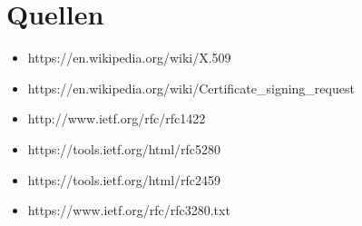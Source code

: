 \chapter{Quellen}
\begin{itemize}
\item https://en.wikipedia.org/wiki/X.509
\item https://en.wikipedia.org/wiki/Certificate\_signing\_request
\item http://www.ietf.org/rfc/rfc1422
\item https://tools.ietf.org/html/rfc5280
\item https://tools.ietf.org/html/rfc2459
\item https://www.ietf.org/rfc/rfc3280.txt
\end{itemize}
